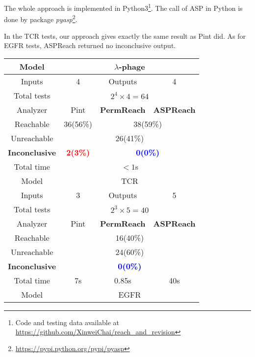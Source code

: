 The whole approach is implemented in Python3\footnote{Code and testing data available at \url{https://github.com/XinweiChai/reach_and_revision}}.
The call of ASP in Python is done by package \textit{pyasp}\footnote{\url{https://pypi.python.org/pypi/pyasp}}. 

In the TCR tests, our approach gives exactly the same result as Pint did. 
As for EGFR tests, ASPReach returned no inconclusive output.

\begin{table}[ht]
\centering
\begin{small}
    \begin{tabular}{|c|c|c|c|}
    \hline
     Model    &  \multicolumn{3}{c|}{$\lambda$-phage}\\
     \hline
     Inputs    & 4 & Outputs& 4\\%
     \hline
     Total tests&\multicolumn{3}{c|}{$2^4\times 4=64$}\\
     \hline
     Analyzer  &  Pint  &  \textbf{PermReach}   &\textbf{ASPReach}\\
     \hline
     Reachable & 36(56\%)& \multicolumn{2}{c|}{38(59\%)} \\
     \hline
     Unreachable&\multicolumn{3}{c|}{26(41\%)}\\
     \hline
     \textbf{Inconclusive} &\textcolor{red}{\textbf{2(3\%)}}&\multicolumn{2}{c|}{\textcolor{blue}{\textbf{0(0\%)}}}\\
     \hline
     Total time & \multicolumn{3}{c|}{$<1$s}\\
    \hline
     Model    &  \multicolumn{3}{c|}{TCR}\\
     \hline
     Inputs    & 3 & Outputs& 5\\
     \hline
     Total tests&\multicolumn{3}{c|}{$2^3\times 5=40$}\\
     \hline
     Analyzer  &  Pint  &  \textbf{PermReach}   &\textbf{ASPReach}\\
     \hline
     Reachable & \multicolumn{3}{c|}{16(40\%)} \\
     \hline
     Unreachable&\multicolumn{3}{c|}{24(60\%)} \\
     \hline
     \textbf{Inconclusive} &\multicolumn{3}{c|}{\textcolor{blue}{\textbf{0(0\%)}}} \\
     \hline
     Total time &  7s     &0.85s  &  40s        \\
    \hline
     Model    &  \multicolumn{3}{c|}{EGFR}\\
     \hline

\end{tabular}
\end{small}
\end{table}
